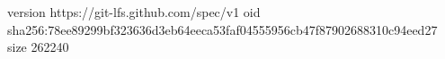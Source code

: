 version https://git-lfs.github.com/spec/v1
oid sha256:78ee89299bf323636d3eb64eeca53faf04555956cb47f87902688310c94eed27
size 262240
